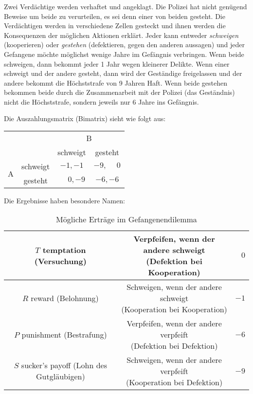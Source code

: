 Zwei Verdächtige werden verhaftet und angeklagt.
Die Polizei hat nicht genügend Beweise um beide zu verurteilen, es sei denn
einer von beiden gesteht.
Die Verdächtigen werden in verschiedene Zellen gesteckt und ihnen werden die
Konsequenzen der möglichen Aktionen erklärt.
Jeder kann entweder \emph{schweigen} (kooperieren) oder \emph{gestehen}
(defektieren, gegen den anderen aussagen) und jeder Gefangene möchte möglichst
wenige Jahre im Gefängnis verbringen.
Wenn beide schweigen, dann bekommt jeder 1 Jahr wegen kleinerer Delikte.
Wenn einer schweigt und der andere gesteht, dann wird der Geständige
freigelassen und der andere bekommt die Höchststrafe von 9 Jahren Haft.
Wenn beide gestehen bekommen beide durch die Zusammenarbeit mit der Polizei (das
Geständnis) nicht die Höchststrafe, sondern jeweils nur 6 Jahre ins Gefängnis.

Die Auszahlungsmatrix (Bimatrix) sieht wie folgt aus:
\begin{center}
  \begin{tabular}{cccc}
    & & \multicolumn{2}{c}{B}\\
    & & schweigt & gesteht\\
    \cmidrule{3-4}
    \multirow{2}{*}{A}
      & schweigt & $-1, -1$ & $-9, \phantom{-}0$\\
    \cmidrule{3-4}
      & gesteht & $\phantom{-}0, -9$ & $-6, -6$\\
    \cmidrule{3-4}
  \end{tabular}
\end{center}

Die Ergebnisse haben besondere Namen:

\begin{table}[h]
  \centering
  \caption{Mögliche Erträge im Gefangenendilemma}
  \label{tab:moegliche_ertraege_im_gefangenendilemma}
  \begin{tabular}{ccr}
    \toprule
    \makecell{$T$\\ temptation\\ (Versuchung)} &
    \makecell{Verpfeifen, wenn der andere schweigt\\[1ex] (Defektion bei Kooperation)} &
    $0$\\
    \midrule
    \makecell{$R$\\ reward\\ (Belohnung)} &
    \makecell{Schweigen, wenn der andere schweigt\\[1ex] (Kooperation bei Kooperation)} &
    $-1$\\
    \midrule
    \makecell{$P$\\ punishment\\ (Bestrafung)} &
    \makecell{Verpfeifen, wenn der andere verpfeift\\[1ex] (Defektion bei Defektion)} &
    $-6$\\
    \midrule
    \makecell{$S$\\ sucker’s payoff\\ (Lohn des Gutgläubigen)} &
    \makecell{Schweigen, wenn der andere verpfeift\\[1ex] (Kooperation bei Defektion)} &
    $-9$\\
    \bottomrule
  \end{tabular}
\end{table}

